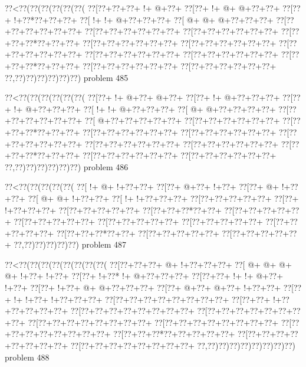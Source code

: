 \vbox{\vbox{\goo
\0??<\0??(\0??(\0??(\0??(\0??(\0??(
\0??[\0??+\0??+\0??+\- !+\- @+\0??+
\0??[\0??+\- !+\- @+\- @+\0??+\0??+
\0??[\0??+\- !+\0??*\0??+\0??+\0??+
\0??[\- !+\- !+\- @+\0??+\0??+\0??+
\0??[\- @+\- @+\- @+\0??+\0??+\0??+
\0??[\0??+\0??+\0??+\0??+\0??+\0??+
\0??[\0??+\0??+\0??+\0??+\0??+\0??+
\0??[\0??+\0??+\0??+\0??+\0??+\0??+
\0??[\0??+\0??+\0??*\0??+\0??+\0??+
\0??[\0??+\0??+\0??+\0??+\0??+\0??+
\0??[\0??+\0??+\0??+\0??+\0??+\0??+
\0??[\0??+\0??+\0??+\0??+\0??+\0??+
\0??[\0??+\0??+\0??+\0??+\0??+\0??+
\0??[\0??+\0??+\0??+\0??+\0??+\0??+
\0??[\0??+\0??+\0??*\0??+\0??+\0??+
\0??[\0??+\0??+\0??+\0??+\0??+\0??+
\0??[\0??+\0??+\0??+\0??+\0??+\0??+
\0??,\0??)\0??)\0??)\0??)\0??)\0??)
}
\hfil problem 485\hfil\break
}

\vbox{\vbox{\goo
\0??<\0??(\0??(\0??(\0??(\0??(\0??(
\0??[\0??+\- !+\- @+\0??+\- @+\0??+
\0??[\0??+\- !+\- @+\0??+\0??+\0??+
\0??[\0??+\- !+\- @+\0??+\0??+\0??+
\0??[\- !+\- !+\- @+\0??+\0??+\0??+
\0??[\- @+\- @+\0??+\0??+\0??+\0??+
\0??[\0??+\0??+\0??+\0??+\0??+\0??+
\0??[\- @+\0??+\0??+\0??+\0??+\0??+
\0??[\0??+\0??+\0??+\0??+\0??+\0??+
\0??[\0??+\0??+\0??*\0??+\0??+\0??+
\0??[\0??+\0??+\0??+\0??+\0??+\0??+
\0??[\0??+\0??+\0??+\0??+\0??+\0??+
\0??[\0??+\0??+\0??+\0??+\0??+\0??+
\0??[\0??+\0??+\0??+\0??+\0??+\0??+
\0??[\0??+\0??+\0??+\0??+\0??+\0??+
\0??[\0??+\0??+\0??*\0??+\0??+\0??+
\0??[\0??+\0??+\0??+\0??+\0??+\0??+
\0??[\0??+\0??+\0??+\0??+\0??+\0??+
\0??,\0??)\0??)\0??)\0??)\0??)\0??)
}
\hfil problem 486\hfil\break
}

\vbox{\vbox{\goo
\0??<\0??(\0??(\0??(\0??(\0??(
\0??[\- !+\- @+\- !+\0??+\0??+
\0??[\0??+\- @+\0??+\- !+\0??+
\0??[\0??+\- @+\- !+\0??+\0??+
\0??[\- @+\- @+\- !+\0??+\0??+
\0??[\- !+\- !+\0??+\0??+\0??+
\0??[\0??+\0??+\0??+\0??+\0??+
\0??[\0??+\- !+\0??+\0??+\0??+
\0??[\0??+\0??+\0??+\0??+\0??+
\0??[\0??+\0??+\0??*\0??+\0??+
\0??[\0??+\0??+\0??+\0??+\0??+
\0??[\0??+\0??+\0??+\0??+\0??+
\0??[\0??+\0??+\0??+\0??+\0??+
\0??[\0??+\0??+\0??+\0??+\0??+
\0??[\0??+\0??+\0??+\0??+\0??+
\0??[\0??+\0??+\0??*\0??+\0??+
\0??[\0??+\0??+\0??+\0??+\0??+
\0??[\0??+\0??+\0??+\0??+\0??+
\0??,\0??)\0??)\0??)\0??)\0??)
}
\hfil problem 487\hfil\break
}

\vbox{\vbox{\goo
\0??<\0??(\0??(\0??(\0??(\0??(\0??(\0??(\0??(
\0??[\0??+\0??+\0??+\- @+\- !+\0??+\0??+\0??+
\0??[\- @+\- @+\- @+\- @+\- !+\0??+\- !+\0??+
\0??[\0??+\- !+\0??*\- !+\- @+\0??+\0??+\0??+
\0??[\0??+\0??+\- !+\- !+\- @+\0??+\- !+\0??+
\0??[\0??+\- !+\0??+\- @+\- @+\0??+\0??+\0??+
\0??[\0??+\- @+\0??+\- @+\0??+\- !+\0??+\0??+
\0??[\0??+\- !+\- !+\0??+\- !+\0??+\0??+\0??+
\0??[\0??+\0??+\0??+\0??+\0??+\0??+\0??+\0??+
\0??[\0??+\0??+\- !+\0??+\0??+\0??+\0??+\0??+
\0??[\0??+\0??+\0??+\0??+\0??+\0??+\0??+\0??+
\0??[\0??+\0??+\0??+\0??+\0??+\0??+\0??+\0??+
\0??[\0??+\0??+\0??+\0??+\0??+\0??+\0??+\0??+
\0??[\0??+\0??+\0??+\0??+\0??+\0??+\0??+\0??+
\0??[\0??+\0??+\0??+\0??+\0??+\0??+\0??+\0??+
\0??[\0??+\0??+\0??*\0??+\0??+\0??+\0??+\0??+
\0??[\0??+\0??+\0??+\0??+\0??+\0??+\0??+\0??+
\0??[\0??+\0??+\0??+\0??+\0??+\0??+\0??+\0??+
\0??,\0??)\0??)\0??)\0??)\0??)\0??)\0??)\0??)
}
\hfil problem 488\hfil\break
}

